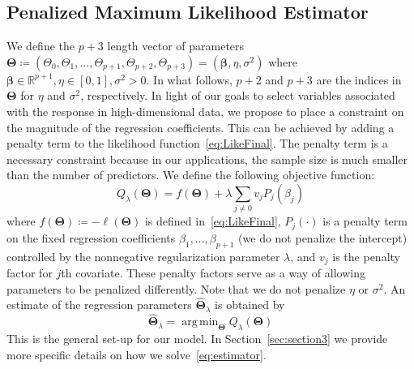 \documentclass[12pt,letter]{article}\usepackage[]{graphicx}\usepackage[]{color}
\newcommand{\bTheta}{\boldsymbol{\Theta}}
\newcommand{\bbeta}{\boldsymbol{\beta}}
\DeclareMathOperator*{\argmin}{arg\,min}
\begin{document}



\subsection{Penalized Maximum Likelihood Estimator}
We define the $p+3$  length vector of parameters $\bTheta \coloneqq \left(\Theta_0, \Theta_1, \ldots, \Theta_{p+1}, \Theta_{p+2}, \Theta_{p+3}\right) =  \left(\bbeta, \eta, \sigma^2 \right)$ where $\bbeta \in \mathbb{R}^{p+1}, \eta \in [0,1], \sigma^2 >0$. In what follows, $p+2$ and $p+3$ are the indices in $\bTheta$ for $\eta$ and $\sigma^2$, respectively. In light of our goals to select variables associated with the response in high-dimensional data, we propose to place a constraint on the magnitude of the regression coefficients. This can be achieved by adding a penalty term to the likelihood function~\eqref{eq:LikeFinal}. The penalty term is a necessary constraint because in our applications, the sample size is much smaller than the number of predictors. We define the following objective function:
\begin{equation}
	Q_{\lambda}(\bTheta) = f(\bTheta) + \lambda \sum_{j\neq 0} v_j P_j(\beta_j)
\end{equation}
where $f(\bTheta)\coloneqq-\ell(\bTheta)$ is defined in~\eqref{eq:LikeFinal}, $P_j(\cdot)$ is a penalty term on the fixed regression coefficients $\beta_1, \ldots, \beta_{p+1}$ (we do not penalize the intercept) controlled by the nonnegative regularization parameter $\lambda$, and $v_j$ is the penalty factor for $j$th covariate. These penalty factors serve as a way of allowing parameters to be penalized differently. Note that we do not penalize $\eta$ or $\sigma^2$. An estimate of the regression parameters $\widehat{\bTheta}_{\lambda}$ is obtained by
\begin{equation}
	\widehat{\bTheta}_{\lambda} = \argmin_{\bTheta} Q_{\lambda}(\bTheta) \label{eq:estimator}
\end{equation}
This is the general set-up for our model. In Section~\ref{sec:section3} we provide more specific details on how we solve~\eqref{eq:estimator}.
\end{document}
